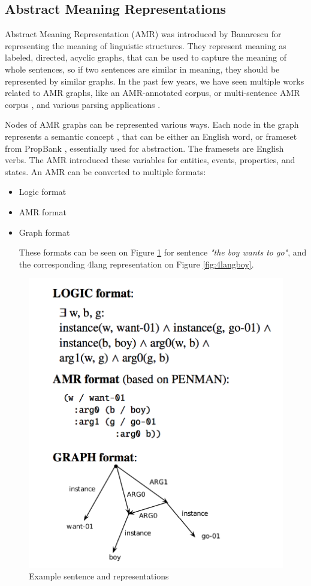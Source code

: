 \subsection{Abstract Meaning Representations}
Abstract Meaning Representation (AMR) was introduced by Banarescu\cite{Banarescu:2013} for representing the meaning of linguistic structures. They represent meaning as labeled, directed, acyclic graphs, that can be used to capture the meaning of whole sentences, so if two sentences are similar in meaning, they should be represented by similar graphs. In the past few years, we have seen multiple works related to AMR graphs, like an AMR-annotated corpus\cite{Banarescu:2013}, or multi-sentence AMR corpus \cite{OGorman2018AMRBT}, and various parsing applications \cite{DAC:2017} \cite{Vanderwende:2015}.

Nodes of AMR graphs can be represented various ways. Each node in the graph represents a semantic concept \cite{AMR:2015}, that can be either an English word, or frameset from PropBank \cite{Palmer:2005}, essentially used for abstraction. The framesets are English verbs. The AMR introduced these variables for entities, events, properties, and states. An AMR can be converted to multiple formats:
\begin{itemize}
	\item Logic format
	\item AMR format
	\item Graph format
	
	These formats can be seen on Figure \ref{fig:amr} for sentence \textit{"the boy wants to go"}, and the corresponding 4lang representation on Figure \ref{fig:4langboy}.
	
\end{itemize}

\begin{figure}[h]
	\centering
	\includegraphics[height=0.4\textwidth]{figures/amr}
	\caption{Example sentence and representations}
	\label{fig:amr}
\end{figure}

